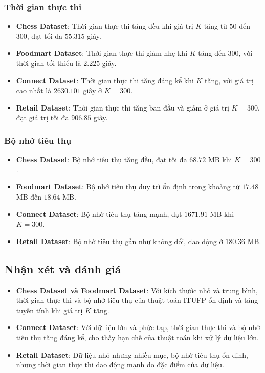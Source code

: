 \documentclass[conference]{IEEEtran}
\begin{document}
\subsubsection{Thời gian thực thi}
\begin{itemize}
    \item \textbf{Chess Dataset}: Thời gian thực thi tăng đều khi giá trị \(K\) tăng từ \(50\) đến \(300\), đạt tối đa \(55.315\) giây.
    \item \textbf{Foodmart Dataset}: Thời gian thực thi giảm nhẹ khi \(K\) tăng đến \(300\), với thời gian tối thiểu là \(2.225\) giây.
    \item \textbf{Connect Dataset}: Thời gian thực thi tăng đáng kể khi \(K\) tăng, với giá trị cao nhất là \(2630.101\) giây ở \(K = 300\).
    \item \textbf{Retail Dataset}: Thời gian thực thi tăng ban đầu và giảm ở giá trị \(K = 300\), đạt giá trị tối đa \(906.85\) giây.
\end{itemize}

\subsubsection{Bộ nhớ tiêu thụ}
\begin{itemize}
    \item \textbf{Chess Dataset}: Bộ nhớ tiêu thụ tăng đều, đạt tối đa \(68.72\) MB khi \(K = 300\).
    \item \textbf{Foodmart Dataset}: Bộ nhớ tiêu thụ duy trì ổn định trong khoảng từ \(17.48\) MB đến \(18.64\) MB.
    \item \textbf{Connect Dataset}: Bộ nhớ tiêu thụ tăng mạnh, đạt \(1671.91\) MB khi \(K = 300\).
    \item \textbf{Retail Dataset}: Bộ nhớ tiêu thụ gần như không đổi, dao động ở \(180.36\) MB.
\end{itemize}

\subsection{Nhận xét và đánh giá}
\begin{itemize}
    \item \textbf{Chess Dataset và Foodmart Dataset}: Với kích thước nhỏ và trung bình, thời gian thực thi và bộ nhớ tiêu thụ của thuật toán ITUFP ổn định và tăng tuyến tính khi giá trị \(K\) tăng.
    \item \textbf{Connect Dataset}: Với dữ liệu lớn và phức tạp, thời gian thực thi và bộ nhớ tiêu thụ tăng đáng kể, cho thấy hạn chế của thuật toán khi xử lý dữ liệu lớn.
    \item \textbf{Retail Dataset}: Dữ liệu nhỏ nhưng nhiều mục, bộ nhớ tiêu thụ ổn định, nhưng thời gian thực thi dao động mạnh do đặc điểm của dữ liệu.
\end{itemize}
\end{document}
